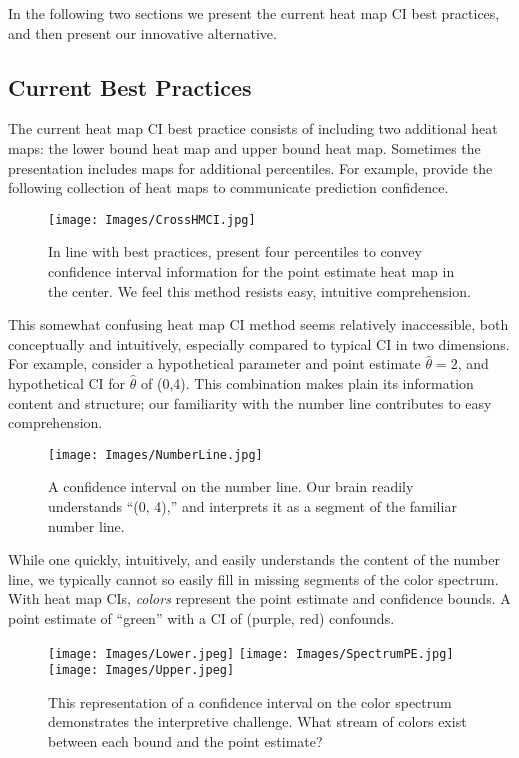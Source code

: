 In the following two sections we present the current heat map CI best practices, and then present our innovative alternative.

\subsection{Current Best Practices}

The current heat map CI best practice consists of including two additional heat maps: the lower bound heat map and upper bound heat map. Sometimes the presentation includes maps for additional percentiles. For example, \cite{Cross2015} provide the following collection of heat maps to communicate prediction confidence.
  \begin{figure}[H]
	\texttt{[image: Images/CrossHMCI.jpg]}
	\caption{In line with best practices, \cite{Cross2015} present four percentiles to convey confidence interval information for the point estimate heat map in the center. We feel this method resists easy, intuitive comprehension.}
	\end{figure}
This somewhat confusing heat map CI method seems relatively inaccessible, both conceptually and intuitively, especially compared to typical CI in two dimensions. For example, consider a hypothetical parameter and point estimate $\hat{\theta} = 2$, and hypothetical CI for $\hat{\theta}$ of (0,4). This combination makes plain its information content and structure; our familiarity with the number line contributes to easy comprehension.
  \begin{figure}[H]
  \centering
	\texttt{[image: Images/NumberLine.jpg]}
	\caption{A confidence interval on the number line. Our brain readily understands ``(0, 4),'' and interprets it as a segment of the familiar number line. } %
	\end{figure}
While one quickly, intuitively, and easily understands the content of the number line, we typically cannot so easily fill in missing segments of the color spectrum. With heat map CIs, {\it colors} represent the point estimate and confidence bounds. A point estimate of ``green'' with a CI of (purple, red) confounds.
  \begin{figure}[H]
  \centering
	\texttt{[image: Images/Lower.jpeg]}
	\texttt{[image: Images/SpectrumPE.jpg]}
	\texttt{[image: Images/Upper.jpeg]}
	\caption{This representation of a confidence interval on the color spectrum demonstrates the interpretive challenge. What stream of colors exist between each bound and the point estimate?}
	\end{figure}
